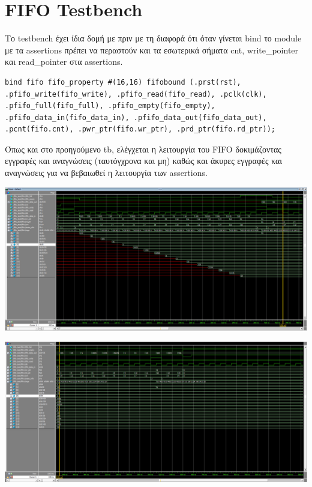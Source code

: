 \documentclass[12pt]{article}
\begin{document}
\section*{FIFO Testbench}
Το testbench έχει ίδια δομή με πριν με τη διαφορά ότι όταν γίνεται bind το module με τα assertions πρέπει να περαστούν και τα εσωτερικά 
σήματα cnt, write\_pointer και read\_pointer στα assertions.
\begin{verbatim} 
bind fifo fifo_property #(16,16) fifobound (.prst(rst), .pfifo_write(fifo_write), .pfifo_read(fifo_read), .pclk(clk), .pfifo_full(fifo_full), .pfifo_empty(fifo_empty), .pfifo_data_in(fifo_data_in), .pfifo_data_out(fifo_data_out), .pcnt(fifo.cnt), .pwr_ptr(fifo.wr_ptr), .prd_ptr(fifo.rd_ptr));
\end{verbatim}
Όπως και στο προηγούμενο tb, ελέγχεται η λειτουργία του FIFO δοκιμάζοντας εγγραφές και αναγνώσεις (ταυτόγχρονα και μη) 
καθώς και άκυρες εγγραφές και αναγνώσεις για να βεβαιωθεί η λειτουργία των assertions.  

\includegraphics[width=\textwidth,height=\textheight,keepaspectratio]{fifo_1.png} 
\linebreak
\linebreak
\linebreak

\includegraphics[width=\textwidth,height=\textheight,keepaspectratio]{fifo_2.png}
\end{document}
